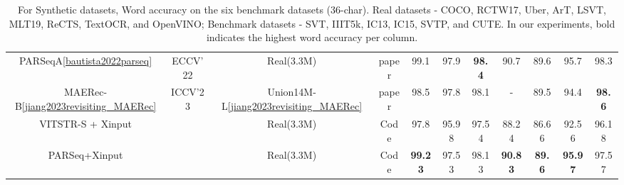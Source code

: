 \documentclass[runningheads]{llncs}
\begin{document}
\begin{table}[htbp]
\begin{tabular}{ccccccccccc}
  PARSeqA\ref*{bautista2022parseq}        & ECCV’22                & Real(3.3M)                     & paper\cite{zhao2023clip4str}                                                            & 99.1           & 97.9          & \textbf{98.4} & 90.7           & 89.6          & 95.7           & 98.3          \\
  MAERec-B\ref*{jiang2023revisiting_MAERec}       & ICCV’23                & Union14M-L\ref*{jiang2023revisiting_MAERec}            & paper\cite{zhao2023clip4str}                                                             & 98.5           & 97.8          & 98.1          & -              & 89.5          & 94.4           & \textbf{98.6} \\ \hline
  VITSTR-S + Xinput       &                        & Real(3.3M)                     & Code                                                                                & 97.8           & 95.98         & 97.54         & 88.24          & 86.66         & 92.56          & 96.18         \\
  PARSeq+Xinput           &                        & Real(3.3M)                     & Code                                                                                & \textbf{99.23} & 97.53         & 98.13         & \textbf{90.83} & \textbf{89.6} & \textbf{95.97} & 97.57         \\ \hline
  \end{tabular}\label{table:Realres}
  \caption[short]{
    For Synthetic datasets, Word accuracy on the six benchmark datasets (36-char). Real datasets - COCO, RCTW17, Uber, ArT, LSVT, MLT19, ReCTS, TextOCR, and OpenVINO; Benchmark datasets - SVT, IIIT5k, IC13, IC15, SVTP, and CUTE. In our experiments, bold indicates the highest word accuracy per column. 
  }
\end{table}
\end{document}

